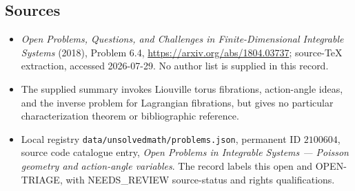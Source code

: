 \documentclass[11pt]{article}
\begin{document}
\subsection{Sources}
\begin{itemize}
\item \emph{Open Problems, Questions, and Challenges in Finite-Dimensional Integrable Systems} (2018), Problem 6.4, \url{https://arxiv.org/abs/1804.03737}; source-TeX extraction, accessed 2026-07-29. No author list is supplied in this record.
\item The supplied summary invokes Liouville torus fibrations, action-angle ideas, and the inverse problem for Lagrangian fibrations, but gives no particular characterization theorem or bibliographic reference.
\item Local registry \texttt{data/unsolvedmath/problems.json}, permanent ID $2100604$, source code catalogue entry, \emph{Open Problems in Integrable Systems --- Poisson geometry and action-angle variables}. The record labels this open and OPEN-TRIAGE, with NEEDS\_REVIEW source-status and rights qualifications.
\end{itemize}
\end{document}
